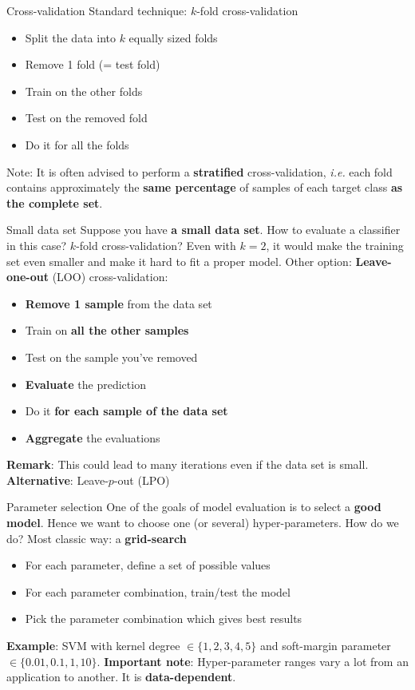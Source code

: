 \documentclass{beamer}
\newcommand{\1}[1]{\mathbbm{1}\left[#1\right]}
\begin{document}
\begin{frame}{Cross-validation}
Standard technique: $k$-fold cross-validation
\begin{itemize}
	\item Split the data into $k$ equally sized folds
	\item Remove 1 fold (= test fold)
	\item Train on the other folds
	\item Test on the removed fold
	\item Do it for all the folds
\end{itemize}
\vfill
\pause
Note: It is often advised to perform a \textbf{stratified} cross-validation, \textit{i.e.} each fold contains approximately the \textbf{same percentage} of samples of each target class \textbf{as the complete set}.
\end{frame}

\begin{frame}{Small data set}
Suppose you have \textbf{a small data set}. How to evaluate a classifier in this case?
\vfill
\pause
$k$-fold cross-validation? Even with $k = 2$, it would make the training set even smaller and make it hard to fit a proper model.
\vfill
\pause
Other option: \textbf{Leave-one-out} (LOO) cross-validation:
\pause
\begin{itemize}
	\item \textbf{Remove 1 sample} from the data set
	\item Train on \textbf{all the other samples}
	\item Test on the sample you've removed
	\item \textbf{Evaluate} the prediction
	\item Do it \textbf{for each sample of the data set}
	\item \textbf{Aggregate} the evaluations
\end{itemize}
\pause
\vfill
\textbf{Remark}: This could lead to many iterations even if the data set is small.
\pause
\vfill
\textbf{Alternative}: Leave-$p$-out (LPO)
\end{frame}

\begin{frame}{Parameter selection}
One of the goals of model evaluation is to select a \textbf{good model}.
\vfill
\pause
Hence we want to choose one (or several) hyper-parameters. How do we do?
\vfill
\pause
Most classic way: a \textbf{grid-search}
\begin{itemize}
	\item For each parameter, define a set of possible values
	\item For each parameter combination, train/test the model
	\item Pick the parameter combination which gives best results
\end{itemize}
\vfill
\pause
\textbf{Example}: SVM with kernel degree $\in \{1, 2, 3, 4, 5\}$ and soft-margin parameter $\in \{0.01, 0.1, 1, 10 \}$.
\vfill
\pause
\textbf{Important note}: Hyper-parameter ranges vary a lot from an application to another. It is \textbf{data-dependent}.
\end{frame}
\end{document}
